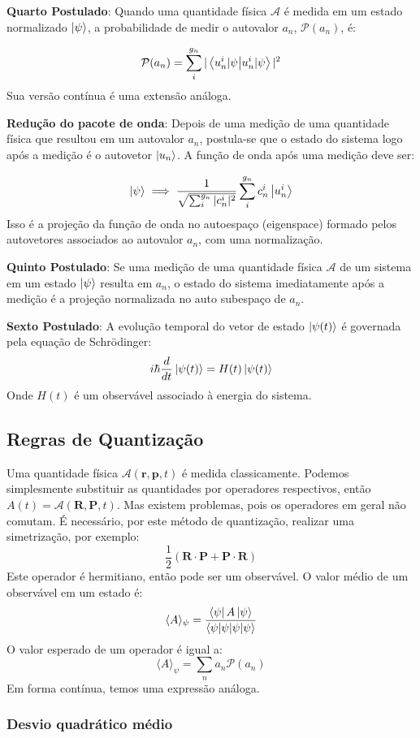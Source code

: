 \documentclass{article}
\begin{document}
	\textbf{Quarto Postulado}: Quando uma quantidade física $\mathcal{A}$ é medida em um estado normalizado $\ket{\psi}$, a probabilidade de medir o autovalor $a_{n}$, $\mathcal{P}(a_{n})$, é:
	
	$$\mathcal{P}(a_{n})=\sum ^{g_{n}}_{i}|\braket{ u^{i}_{n} |\psi  }|^{2} $$
	Sua versão contínua é uma extensão análoga.
	
	\textbf{Redução do pacote de onda}: Depois de uma medição de uma quantidade física que resultou em um autovalor $a_{n}$, postula-se que o estado do sistema logo após a medição é o autovetor $\ket{u_{n}}$.
	A função de onda após uma medição deve ser:
	
	$$\ket{\psi}\implies \frac{1}{\sqrt{ \sum ^{g_{n}}_{i} |c^{i}_{n}|^{2}}}\sum ^{g_{n}}_{i}c^{i}_{n}\ket{u^{i}_{n}}  $$
	Isso é a projeção da função de onda no autoespaço (eigenspace) formado pelos autovetores associados ao autovalor $a_{n}$, com uma normalização.
	
	\textbf{Quinto Postulado}: Se uma medição de uma quantidade física $\mathcal{A}$ de um sistema em um estado $\ket{\psi}$ resulta em $a_{n}$, o estado do sistema imediatamente após a medição é a projeção normalizada no auto subespaço de $a_{n}$.
	
	\textbf{Sexto Postulado}: A evolução temporal do vetor de estado $\ket{\psi(t)}$ é governada pela equação de Schrödinger:
	$$i\hbar \frac{d}{dt}\ket{\psi(t)}=H(t)\ket{\psi(t)}  $$
	Onde $H(t)$ é um observável associado à energia do sistema.
	
	\subsection{Regras de Quantização}
	
	Uma quantidade física $\mathcal{A}(\mathbf{r,p},t)$ é medida classicamente. Podemos simplesmente substituir as quantidades por operadores respectivos, então $A(t)=\mathcal{A}(\mathbf{R,P},t)$. Mas existem problemas, pois os operadores em geral não comutam. É necessário, por este método de quantização, realizar uma simetrização, por exemplo:
	$$\frac{1}{2}(\mathbf{R\cdot P}+\mathbf{P\cdot R})$$
	Este operador é hermitiano, então pode ser um observável. O valor médio de um observável em um estado é:
	$$\langle A \rangle_{\psi}=\frac{\bra{\psi}A\ket{\psi}}{\braket{ \psi |\psi  } } $$
	O valor esperado de um operador é igual a:
	$$\langle A \rangle_{\psi}=\sum_{n}a_{n}\mathcal{P}(a_{n})$$
	Em forma contínua, temos uma expressão análoga.
	
	\subsubsection{Desvio quadrático médio}
	
\end{document}
